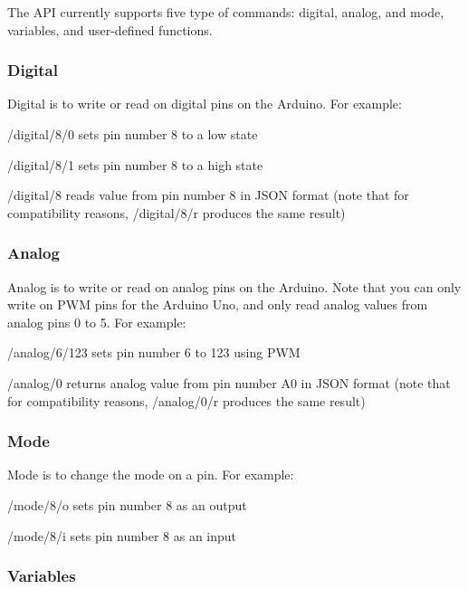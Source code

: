 The A\+PI currently supports five type of commands\+: digital, analog, and mode, variables, and user-\/defined functions.

\subsubsection*{Digital}

Digital is to write or read on digital pins on the Arduino. For example\+:
\begin{DoxyItemize}
\item {\ttfamily /digital/8/0} sets pin number 8 to a low state
\item {\ttfamily /digital/8/1} sets pin number 8 to a high state
\item {\ttfamily /digital/8} reads value from pin number 8 in J\+S\+ON format (note that for compatibility reasons, {\ttfamily /digital/8/r} produces the same result)
\end{DoxyItemize}

\subsubsection*{Analog}

Analog is to write or read on analog pins on the Arduino. Note that you can only write on P\+WM pins for the Arduino Uno, and only read analog values from analog pins 0 to 5. For example\+:
\begin{DoxyItemize}
\item {\ttfamily /analog/6/123} sets pin number 6 to 123 using P\+WM
\item {\ttfamily /analog/0} returns analog value from pin number A0 in J\+S\+ON format (note that for compatibility reasons, {\ttfamily /analog/0/r} produces the same result)
\end{DoxyItemize}

\subsubsection*{Mode}

Mode is to change the mode on a pin. For example\+:
\begin{DoxyItemize}
\item {\ttfamily /mode/8/o} sets pin number 8 as an output
\item {\ttfamily /mode/8/i} sets pin number 8 as an input
\end{DoxyItemize}

\subsubsection*{Variables}

